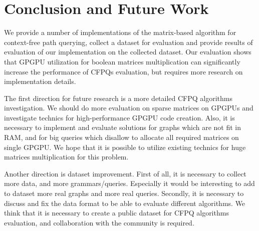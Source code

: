 \section{Conclusion and Future Work}

We provide a number of implementations of the matrix-based algorithm for context-free path querying, collect a dataset for evaluation and provide results of evaluation of our implementation on the collected dataset.
Our evaluation shows that GPGPU utilization for boolean matrices multiplication can significantly increase the performance of CFPQs evaluation, but requires more research on implementation details.

The first direction for future research is a more detailed CFPQ algorithms investigation.
We should do more evaluation on sparse matrices on GPGPUs and investigate technics for high-performance GPGPU code creation.
Also, it is necessary to implement and evaluate solutions for graphs which are not fit in RAM, and for big queries which disallow to allocate all required matrices on single GPGPU.
We hope that it is possible to utilize existing technics for huge matrices multiplication for this problem.

Another direction is dataset improvement.
First of all, it is necessary to collect more data, and more grammars/queries.
Especially it would be interesting to add to dataset more real graphs and more real queries.
Secondly, it is necessary to discuss and fix the data format to be able to evaluate different algorithms.
We think that it is necessary to create a public dataset for CFPQ algorithms evaluation, and collaboration with the community is required.

